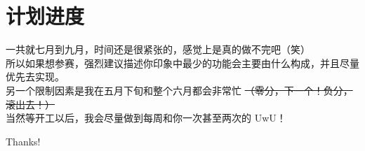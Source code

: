 \documentclass{beamer}
\begin{document}
\section{计划进度}
\begin{frame}
    \quad \quad 一共就七月到九月，时间还是很紧张的，感觉上是真的做不完吧（笑） \\
    
    \quad \quad 所以如果想参赛，强烈建议描述你印象中最少的功能会主要由什么构成，并且尽量优先去实现。\\

    \quad \quad 另一个限制因素是我在五月下旬和整个六月都会非常忙
    \sout{（零分，下一个！负分，滚出去！）}\\

    \quad \quad 当然等开工以后，我会尽量做到每周和你一次甚至两次的 UwU！
\end{frame}

\begin{frame}
    \begin{center}
        {\Huge\calligra Thanks!}
    \end{center}
\end{frame}
\end{document}
